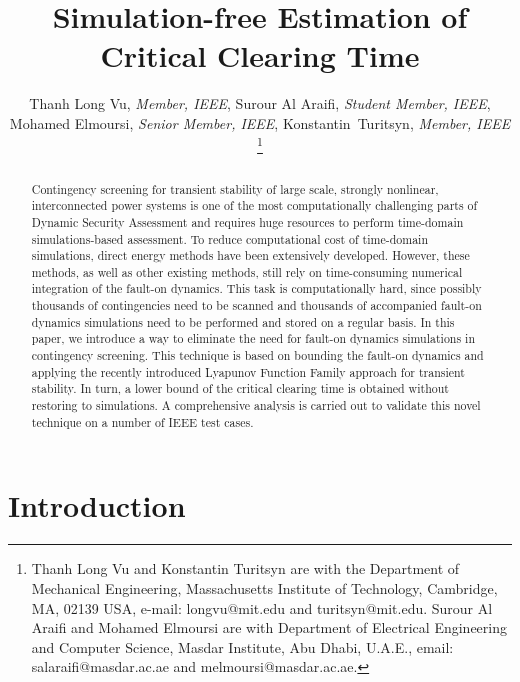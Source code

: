 \documentclass[final]{IEEEtran}
\title{Simulation-free Estimation of Critical Clearing Time}
\author{Thanh Long Vu, \textit{Member, IEEE}, Surour Al Araifi, \textit{Student Member, IEEE}, Mohamed Elmoursi, \textit{Senior Member, IEEE}, Konstantin~Turitsyn, \textit{Member, IEEE}%
\thanks{Thanh Long Vu and Konstantin Turitsyn are with the Department of Mechanical Engineering, Massachusetts Institute of Technology, Cambridge, MA, 02139 USA, e-mail: longvu@mit.edu and turitsyn@mit.edu.
Surour Al Araifi and Mohamed Elmoursi  are with Department of
Electrical Engineering and Computer Science, Masdar Institute, Abu
Dhabi, U.A.E., email: salaraifi@masdar.ac.ae and
melmoursi@masdar.ac.ae.

}}%
\begin{document}
\maketitle
\begin{abstract}
Contingency screening for transient stability of large scale, strongly nonlinear,
interconnected  power systems is one of the
most computationally challenging parts of Dynamic Security
Assessment and requires huge resources to perform time-domain
simulations-based assessment. To reduce computational cost of time-domain
simulations, direct energy methods have been extensively developed. 
However, these methods, as well as other existing
methods, still rely on time-consuming numerical integration of
the fault-on dynamics. This task is computationally hard, since
possibly thousands of contingencies need to be scanned and
thousands of accompanied fault-on dynamics simulations need to be
performed and stored on a regular basis. In this paper, we
introduce a way to eliminate the need for fault-on dynamics
simulations in contingency screening. This technique is based on
bounding the fault-on dynamics and applying the recently
introduced Lyapunov Function Family approach for transient
stability. In turn, a lower bound of the critical
clearing time is obtained without restoring to simulations. 
A comprehensive analysis is carried out to validate this novel 
technique on a number of IEEE test cases.
\end{abstract}



\maketitle

\section{Introduction}

\end{document}
